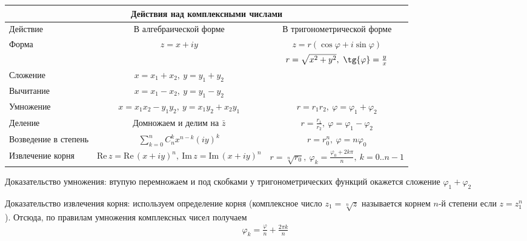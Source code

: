 \documentclass[12pt]{extarticle}
\newcommand{\RE}{\mathrm{Re}\,}
\newcommand{\IM}{\mathrm{Im}\,}
\begin{document}
\par
\begin{tabular}{l|c|c}
    \multicolumn{3}{c}{Действия над комплексными числами}\\\hline
    Действие & В алгебраической форме & В тригонометрической форме \\\hline
    Форма & $z=x+iy$ & $z=r(\cos \varphi + i\sin \varphi)$ \\
          & & $r=\sqrt{x^{2}+y^{2}},\ \tg{\varphi}=\frac{y}{x}$ \\\hline
    Сложение & $x=x_{1}+x_{2},\ y=y_{1}+y_{2} $ \\
    Вычитание & $x=x_{1}-x_{2},\ y=y_{1}-y_{2} $ \\

    Умножение & $x=x_{1}x_{2}-y_{1}y_{2},\ y=x_{1}y_{2}+x_{2}y_{1} $ &
    $r=r_{1}r_{2},\ \varphi=\varphi_{1}+\varphi_{2}$ \\

    Деление & Домножаем и делим на $\bar{z}$ &
    $r=\frac{r_{1}}{r_{2}},\ \varphi=\varphi_{1}-\varphi_{2}$ \\

    Возведение в степень &
    $\sum\limits_{k=0}^{n}C_{n}^{k}x^{n-k}(iy)^{k}$ &
    $r=r_{0}^{n},\ \varphi=n\varphi_{0}$\\

    Извлечение корня & $\RE{z}= \RE(x+iy)^{n},\ \IM{z}=\IM(x+iy)^{n}$ &
    $r=\sqrt[n]{r_{0}},\ \varphi_{k}=\frac{\varphi_{0}+2k\pi}{n},\ k=0..n-1$\\
    \hline
\end{tabular}
\begin{description}
    \item Доказательство умножения: втупую перемножаем и под скобками
        у тригонометрических функций окажется сложение $\varphi_{1}+\varphi_{2}$
    \item Доказательство извлечения корня: используем определение
        корня (комплексное число $z_{1}=\sqrt[n]{z}$ называется корнем
        $n$-й степени если $z=z_{1}^{n}$). Отсюда, по правилам умножения
        комплексных чисел получаем
        \begin{eqnarray*}
            \varphi_{k}=\frac{\varphi}{n}+\frac{2\pi k}{n}
        \end{eqnarray*}
\end{description}
\end{document}
